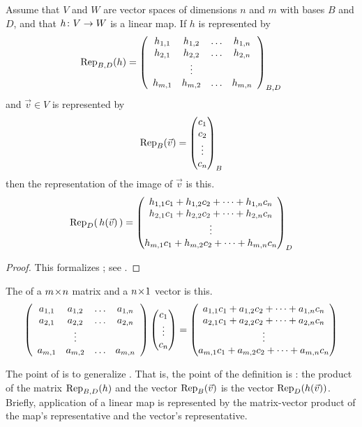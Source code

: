 \begin{theorem} \label{th:MatMultRepsFuncAppl}
Assume that \( V \) and \( W \) are vector spaces
of dimensions \( n \) and \( m \)
with bases \( B \) and \( D \),
and that \( \map{h}{V}{W} \) is a linear map.
If \( h \) is represented by
\begin{equation*}
  \rep{h}{B,D}=\generalmatrix{h}{n}{m}_{B,D}
\end{equation*}
and \( \vec{v}\in V \) is represented by
\begin{equation*}
  \rep{\vec{v}}{B}=\colvec{c_1 \\ c_2 \\ \vdots \\ c_n}_B
\end{equation*}
then the representation of the image of $\vec{v}$ is this.
\begin{equation*}
  \rep{\, h(\vec{v}) \,}{D}
  =
  \colvec{h_{1,1}c_1+h_{1,2}c_2+\dots+h_{1,n}c_n \\
          h_{2,1}c_1+h_{2,2}c_2+\dots+h_{2,n}c_n \\
          \vdots \\
          h_{m,1}c_1+h_{m,2}c_2+\dots+h_{m,n}c_n}_D
\end{equation*}
\end{theorem}

\begin{proof}
This formalizes ; 
see .
\end{proof}

\begin{definition}
\label{def:MatrixVecProd}
The %
of a \( \nbym{m}{n} \) matrix and a
\( \nbym{n}{1} \) vector is this.
\begin{equation*}
  \generalmatrix{a}{n}{m}
  \colvec{c_1 \\ \vdots \\ c_n}
  =
  \colvec{a_{1,1}c_1+a_{1,2}c_2+\dots+a_{1,n}c_n \\
             a_{2,1}c_1+a_{2,2}c_2+\dots+a_{2,n}c_n \\
             \vdots \\ 
             a_{m,1}c_1+a_{m,2}c_2+\dots+a_{m,n}c_n}
\end{equation*}
\end{definition}

The point of  is to generalize
.
That is, the point of the definition is 
: 
the product of the matrix $\rep{h}{B,D}$ and the vector $\rep{\vec{v}}{B}$ 
is the vector $\rep{h(\vec{v})}{D}$.
Briefly, 
application of a linear map is represented by the matrix-vector product 
of the map's representative and the vector's representative.

